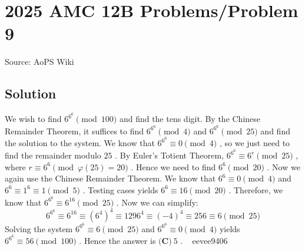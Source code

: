 \documentclass[12pt]{article}
\begin{document}
\section*{{2025 AMC 12B Problems/Problem 9}}
Source: AoPS Wiki

\subsection*{Solution}
We wish to find $6^{6^6}\pmod{100}$ and find the tens digit. By the Chinese Remainder Theorem, it suffices to find $6^{6^6}\pmod{4}$ and $6^{6^6}\pmod{25}$ and find the solution to the system. We know that $6^{6^6}\equiv 0\pmod{4}$ , so we just need to find the remainder modulo $25$ . By Euler’s Totient Theorem, $6^{6^6}\equiv 6^r\pmod{25}$ , where $r\equiv 6^6\pmod{\varphi(25)=20}$ . Hence we need to find $6^6\pmod{20}$ . Now we again use the Chinese Remainder Theorem. We know that $6^6\equiv 0\pmod{4}$ and $6^6\equiv 1^6\equiv 1\pmod{5}$ . Testing cases yields $6^6\equiv 16\pmod{20}$ . Therefore, we know that $6^{6^6}\equiv 6^{16}\pmod{25}$ . Now we can simplify: \[6^{6^6}\equiv 6^{16}\equiv (6^4)^4\equiv 1296^4\equiv (-4)^4\equiv 256\equiv 6\pmod{25}\] Solving the system $6^{6^6}\equiv 6\pmod{25}$ and $6^{6^6}\equiv 0\pmod{4}$ yields $6^{6^6}\equiv 56\pmod{100}$ . Hence the answer is $\boxed{\textbf{(C)}~5}$ . ~ eevee9406
\end{document}
